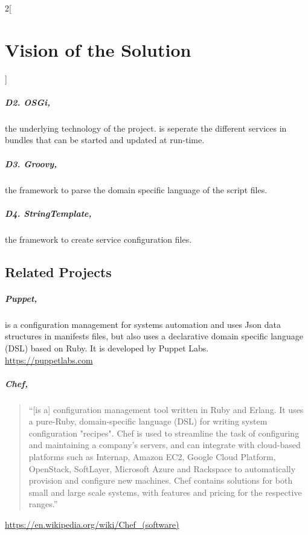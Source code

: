 \begin{multicols}{2}[\chapter{Vision of the Solution}]
\paragraph{D2. OSGi,}
the underlying technology of the project. \AppName{} is seperate the different
services in bundles that can be started and updated at run-time.

\paragraph{D3. Groovy,}
the framework to parse the domain specific language of the script files.

\paragraph{D4. StringTemplate,}
the framework to create service configuration files.

\section{Related Projects}

\paragraph{Puppet,}

is a configuration management for systems automation and 
uses Json data structures in manifests files, but also uses 
a declarative domain specific language (DSL) based on Ruby. It is developed
by Puppet Labs.\\
\url{https://puppetlabs.com}

\paragraph{Chef,}
\begin{quotation}
``[is a] configuration management tool written in Ruby and Erlang. It uses a 
pure-Ruby, domain-specific language (DSL) for writing system configuration 
"recipes". Chef is used to streamline the task of configuring and maintaining a 
company's servers, and can integrate with cloud-based platforms such as 
Internap, Amazon EC2, Google Cloud Platform, OpenStack, SoftLayer, Microsoft 
Azure and Rackspace to automatically provision and configure new machines. Chef 
contains solutions for both small and large scale systems, with features and 
pricing for the respective ranges.''
\end{quotation}
\url{https://en.wikipedia.org/wiki/Chef_(software)}



\end{multicols}
